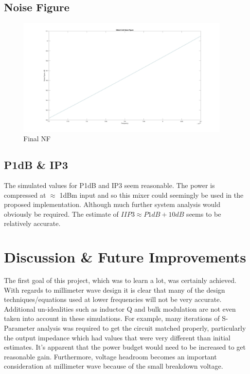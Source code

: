 \documentclass{article}                                                         %
\begin{document}
\subsection{Noise Figure}
\begin{figure}[H]
  \centering
  \includegraphics[width=0.95\textwidth] {Plots/NF.jpg}
  \caption{Final NF}
    \label{fig:matNF}
\end{figure}

\subsection{P1dB \& IP3}
The simulated values for P1dB and IP3 seem reasonable. The power is compressed at $\approx$
1dBm input and so this mixer could seemingly be used in the proposed implementation. Although
much further system analysis would obviously be required. The estimate of $IIP3 \approx P1dB+10dB $
seems to be relatively accurate.

\newpage
\section{Discussion \& Future Improvements }
The first goal of this project, which was to learn a lot, was certainly achieved. With regards to millimeter wave design it is clear that
many of the design techniques/equations used at lower frequencies will not be very accurate. Additional un-idealities such as inductor
Q and bulk modulation are not even taken into account in these simulations.
For example, many iterations of S-Parameter analysis
was required to get the circuit matched properly, particularly the output impedance which had values that were very different than initial  estimates.
It's apparent that the power budget would need to be increased to get reasonable gain. Furthermore, voltage headroom becomes an important consideration at
millimeter wave because of the small breakdown voltage.
\end{document}
